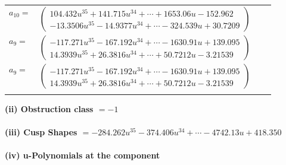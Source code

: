\documentclass[1p]{elsarticle_modified}
\theoremstyle{definition}
\begin{document}
\begin{tabular}{m{7pt} m{180pt} m{7pt} m{180pt} }
\flushright $a_{10}=$&$\begin{pmatrix}104.432 u^{35}+141.715 u^{34}+\cdots+1653.06 u-152.962\\-13.3506 u^{35}-14.9377 u^{34}+\cdots-324.539 u+30.7209\end{pmatrix}$ \\
\flushright $a_{9}=$&$\begin{pmatrix}-117.271 u^{35}-167.192 u^{34}+\cdots-1630.91 u+139.095\\14.3939 u^{35}+26.3816 u^{34}+\cdots+50.7212 u-3.21539\end{pmatrix}$\\ \flushright $a_{9}=$&$\begin{pmatrix}-117.271 u^{35}-167.192 u^{34}+\cdots-1630.91 u+139.095\\14.3939 u^{35}+26.3816 u^{34}+\cdots+50.7212 u-3.21539\end{pmatrix}$\\&\end{tabular}
\flushleft \textbf{(ii) Obstruction class $= -1$}\\~\\
\flushleft \textbf{(iii) Cusp Shapes $= -284.262 u^{35}-374.406 u^{34}+\cdots-4742.13 u+418.350$}\\~\\
\newpage\renewcommand{\arraystretch}{1}
\flushleft \textbf{(iv) u-Polynomials at the component}\newline \\
\end{document}
